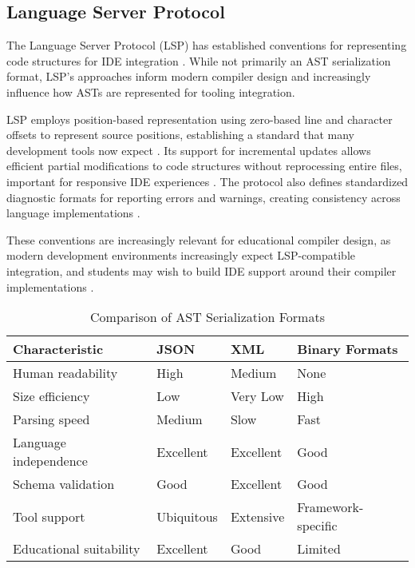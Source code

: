 \subsection{Language Server Protocol}

The Language Server Protocol (LSP) has established conventions for representing code structures for IDE integration \cite{microsoft2016language}. While not primarily an AST serialization format, LSP's approaches inform modern compiler design and increasingly influence how ASTs are represented for tooling integration.

LSP employs position-based representation using zero-based line and character offsets to represent source positions, establishing a standard that many development tools now expect \cite{microsoft2016language}. Its support for incremental updates allows efficient partial modifications to code structures without reprocessing entire files, important for responsive IDE experiences \cite{microsoft2016language}. The protocol also defines standardized diagnostic formats for reporting errors and warnings, creating consistency across language implementations \cite{microsoft2016language}.

These conventions are increasingly relevant for educational compiler design, as modern development environments increasingly expect LSP-compatible integration, and students may wish to build IDE support around their compiler implementations \cite{microsoft2016language}.

\begin{table}[h!]
    \centering
    \label{tab:serialization-comparison}
    \begin{tabularx}{\textwidth}{|
        >{\raggedright\arraybackslash}p{2.5cm}|
        >{\centering\arraybackslash}X|
        >{\centering\arraybackslash}X|
        >{\centering\arraybackslash}X|
      }
      \hline
      \textbf{Characteristic} & \textbf{JSON} & \textbf{XML} & \textbf{Binary Formats} \\
      \hline
      Human readability     & High          & Medium       & None                   \\
      \hline
      Size efficiency       & Low           & Very Low     & High                   \\
      \hline
      Parsing speed         & Medium        & Slow         & Fast                   \\
      \hline
      Language independence & Excellent     & Excellent    & Good                   \\
      \hline
      Schema validation     & Good          & Excellent    & Good                   \\
      \hline
      Tool support          & Ubiquitous    & Extensive    & Framework-specific     \\
      \hline
      Educational suitability & Excellent   & Good         & Limited                \\
      \hline
    \end{tabularx}
    \caption{Comparison of AST Serialization Formats}
\end{table}


